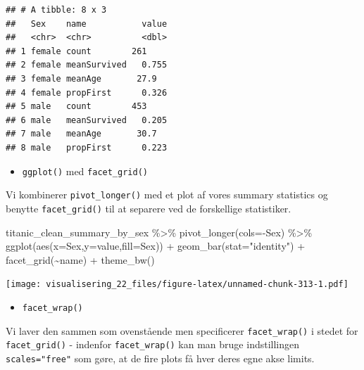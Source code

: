 \documentclass[
]{book}
\newenvironment{Shaded}{\begin{snugshade}}{\end{snugshade}}
\newcommand{\AttributeTok}[1]{\textcolor[rgb]{0.77,0.63,0.00}{#1}}
\newcommand{\FunctionTok}[1]{\textcolor[rgb]{0.00,0.00,0.00}{#1}}
\newcommand{\NormalTok}[1]{#1}
\newcommand{\SpecialCharTok}[1]{\textcolor[rgb]{0.00,0.00,0.00}{#1}}
\newcommand{\StringTok}[1]{\textcolor[rgb]{0.31,0.60,0.02}{#1}}
\providecommand{\tightlist}{%
  \setlength{\itemsep}{0pt}\setlength{\parskip}{0pt}}
\begin{document}
\begin{verbatim}
## # A tibble: 8 x 3
##   Sex    name           value
##   <chr>  <chr>          <dbl>
## 1 female count        261    
## 2 female meanSurvived   0.755
## 3 female meanAge       27.9  
## 4 female propFirst      0.326
## 5 male   count        453    
## 6 male   meanSurvived   0.205
## 7 male   meanAge       30.7  
## 8 male   propFirst      0.223
\end{verbatim}

\begin{itemize}
\tightlist
\item
  \texttt{ggplot()} med \texttt{facet\_grid()}
\end{itemize}

Vi kombinerer \texttt{pivot\_longer()} med et plot af vores summary statistics og benytte \texttt{facet\_grid()} til at separere ved de forskellige statistiker.

\begin{Shaded}
\begin{Highlighting}[]
\NormalTok{titanic\_clean\_summary\_by\_sex }\SpecialCharTok{\%\textgreater{}\%} 
  \FunctionTok{pivot\_longer}\NormalTok{(}\AttributeTok{cols=}\SpecialCharTok{{-}}\NormalTok{Sex) }\SpecialCharTok{\%\textgreater{}\%}
  \FunctionTok{ggplot}\NormalTok{(}\FunctionTok{aes}\NormalTok{(}\AttributeTok{x=}\NormalTok{Sex,}\AttributeTok{y=}\NormalTok{value,}\AttributeTok{fill=}\NormalTok{Sex)) }\SpecialCharTok{+} 
  \FunctionTok{geom\_bar}\NormalTok{(}\AttributeTok{stat=}\StringTok{"identity"}\NormalTok{) }\SpecialCharTok{+} 
  \FunctionTok{facet\_grid}\NormalTok{(}\SpecialCharTok{\textasciitilde{}}\NormalTok{name) }\SpecialCharTok{+}
  \FunctionTok{theme\_bw}\NormalTok{()}
\end{Highlighting}
\end{Shaded}

\texttt{[image: visualisering\_22\_files/figure-latex/unnamed-chunk-313-1.pdf]}

\begin{itemize}
\tightlist
\item
  \texttt{facet\_wrap()}
\end{itemize}

Vi laver den sammen som ovenstående men specificerer \texttt{facet\_wrap()} i stedet for \texttt{facet\_grid()} - indenfor \texttt{facet\_wrap()} kan man bruge indstillingen \texttt{scales="free"} som gøre, at de fire plots få hver deres egne akse limits.
\end{document}
